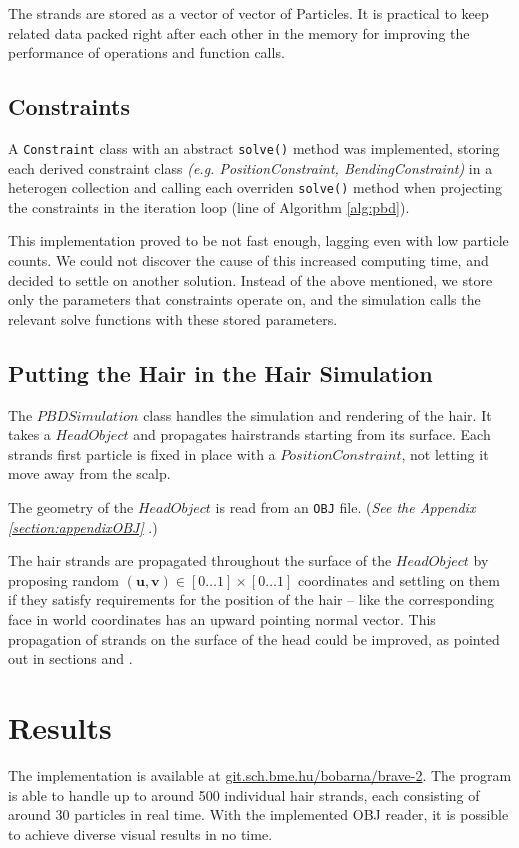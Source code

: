 \documentclass[sigplan,screen,nonacm]{acmart}
\renewcommand{\b}{\boldsymbol}
\begin{document}
The strands are stored as a vector of vector of Particles. It is practical to
keep related data packed right after each other in the memory for improving the
performance of operations and function calls.


\subsection{Constraints}
A \texttt{Constraint} class with an abstract \texttt{solve()} method was
implemented, storing each derived constraint class \emph{(e.g.
PositionConstraint, BendingConstraint)} in a heterogen
collection and calling each overriden \texttt{solve()} method when projecting
the constraints in the iteration loop (line  of Algorithm
\ref{alg:pbd}).

This implementation proved to be not fast enough, lagging even with low particle
counts. We could not discover the cause of this increased computing time, and
decided to settle on another solution. Instead of the above mentioned, we
store only the parameters that constraints operate on, and the simulation calls
the relevant solve functions with these stored parameters.


\subsection{Putting the Hair in the Hair Simulation}
The $PBDSimulation$ class handles the simulation and rendering of the hair. It
takes a $HeadObject$ and propagates hairstrands starting from its surface. Each
strands first particle is fixed in place with a $PositionConstraint$, not
letting it move away from the scalp.

The geometry of the $HeadObject$ is read from an \texttt{OBJ} file. (\emph{See
the Appendix \ref{section:appendixOBJ} }.)

The hair strands are propagated throughout the surface of the $HeadObject$ by
proposing random $(\b{u}, \b{v}) \in [0 \ldots 1] \times [0 \ldots 1]$
coordinates and settling on them if they satisfy requirements for the position
of the hair -- like the corresponding face in world coordinates has an upward
pointing normal vector. This propagation of strands on the surface of the head
could be improved, as pointed out in sections
 and .
 

\section{Results}
The implementation is available at \url{git.sch.bme.hu/bobarna/brave-2}. The
program is able to handle up to around 500 individual hair strands, each
consisting of around 30 particles in real time. With the implemented OBJ reader,
it is possible to achieve diverse visual results in no time.
\end{document}
